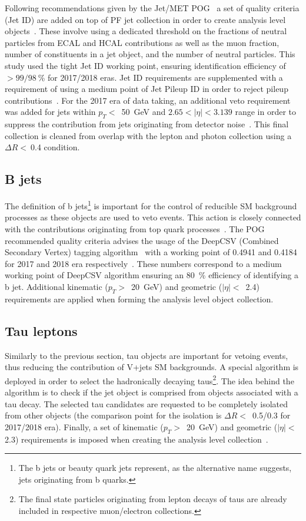 \hspace{10pt} Following recommendations given by the Jet/MET POG~\cite{twiki_jet_met} a set of quality criteria (Jet ID) are added on top of PF jet collection in order to create analysis level objects~\cite{twiki_jet_id}. These involve using a dedicated threshold on the fractions of neutral particles from ECAL and HCAL contributions as well as the muon fraction, number of constituents in a jet object, and the number of neutral particles. This study used the tight Jet ID working point, ensuring identification efficiency of $>99/98~$\% for 2017/2018 eras. Jet ID requirements are supplemented with a requirement of using a medium point of Jet Pileup ID in order to reject pileup contributions~\cite{twiki_jet_pileupid}. For the 2017 era of data taking, an additional veto requirement was added for jets within $p_T<$~50~GeV and $2.65<|\eta|<3.139$ range in order to suppress the contribution from jets originating from detector noise~\cite{note:AN_19_257}. This final collection is cleaned from overlap with the lepton and photon collection using a $\Delta R<~$0.4 condition.
\subsection{B jets}
\hspace{10pt} The definition of b jets\footnote{The b jets or beauty quark jets represent, as the alternative name suggests, jets originating from b quarks.} is important for the control of reducible SM background processes as these objects are used to veto events. This action is closely connected with the contributions originating from top quark processes~\cite{note:AN_19_257}. The POG recommended quality criteria advises the usage of the DeepCSV (Combined Secondary Vertex) tagging algorithm~\cite{paper_deepcsv} with a working point of 0.4941 and 0.4184 for 2017 and 2018 era respectively~\cite{twiki_btag_1}. These numbers correspond to a medium working point of DeepCSV algorithm ensuring an 80~\% efficiency of identifying a b jet. Additional kinematic ($p_T>$~20~GeV) and geometric ($|\eta|<$~2.4) requirements are applied when forming the analysis level object collection.
\subsection{Tau leptons}
\hspace{10pt} Similarly to the previous section, tau objects are important for vetoing events, thus reducing the contribution of V+jets SM backgrounds. A special algorithm is deployed in order to select the hadronically decaying taus\footnote{The final state particles originating from lepton decays of taus are already included in respective muon/electron collections.}. The idea behind the algorithm is to check if the jet object is comprised from objects associated with a tau decay. The selected tau candidates are requested to be completely isolated from other objects (the comparison point for the isolation is $\Delta R<$~0.5/0.3 for 2017/2018 era). Finally, a set of kinematic ($p_T>$~20~GeV) and geometric ($|\eta|<~$2.3) requirements is imposed when creating the analysis level collection~\cite{twiki_tau_pog}.

